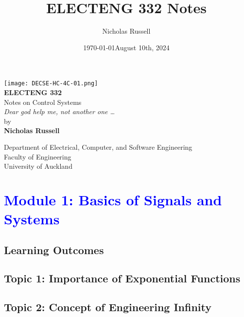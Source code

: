 \documentclass[12pt]{report}
\title{ELECTENG 332 Notes}
\author{Nicholas Russell}
\date{\today}
\begin{document}
\begin{titlepage}
\centering

\texttt{[image: DECSE-HC-4C-01.png]}\\[1cm] %


{\LARGE \textbf{ELECTENG 332}}\\[0.5cm]
{\Large Notes on Control Systems}\\[0.5cm]

{\textit{Dear god help me, not another one \dots}}\\[2cm]

{\large by}\\[0.3cm]
{\large \textbf{Nicholas Russell}}\\[1.4cm]
{\large \date{August 10th, 2024}}

\vfill %

{\large Department of Electrical, Computer, and Software Engineering}\\[0.3cm]
{\large Faculty of Engineering}\\[0.3cm]
{\large University of Auckland}




\end{titlepage}



\tableofcontents
\newpage

\chapter{\textcolor{blue}{Module 1: Basics of Signals and Systems}}

\section{Learning Outcomes}

\section{Topic 1: Importance of Exponential Functions}

\section{Topic 2: Concept of Engineering Infinity}
\end{document}
